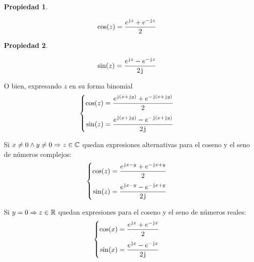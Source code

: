\documentclass[a5paper,12pt,twoside]{book}
\newtheorem{prop}{{Propiedad}}[chapter]
\begin{document}
\begin{mdframed}[style=PropertyFrame]
    \begin{prop}
    \end{prop}
    \begin{equation*}
        \cos(z) = \frac{e^{\mkern2mu\mathrm{j}\mkern1mu z} + e^{-\mkern2mu\mathrm{j}\mkern1mu z}}{2}
    \end{equation*}
\end{mdframed}

\begin{mdframed}[style=PropertyFrame]
    \begin{prop}
    \end{prop}
    \begin{equation*}
        \sin(z) = \frac{e^{\mkern2mu\mathrm{j}\mkern1mu z} - e^{-\mkern2mu\mathrm{j}\mkern1mu z}}{2 \mkern2mu\mathrm{j}\mkern1mu}
    \end{equation*}
\end{mdframed}

O bien, expresando $z$ en su forma binomial
\begin{equation*}
    \left\{
    \begin{aligned}
        \cos(z) = \frac{e^{\mkern2mu\mathrm{j}\mkern1mu \left(x + \mkern2mu\mathrm{j}\mkern1mu y \right)} + e^{-\mkern2mu\mathrm{j}\mkern1mu \left(x + \mkern2mu\mathrm{j}\mkern1mu y \right)}}{2}
        \\[1ex]
        \sin(z) = \frac{e^{\mkern2mu\mathrm{j}\mkern1mu \left(x + \mkern2mu\mathrm{j}\mkern1mu y \right)} - e^{-\mkern2mu\mathrm{j}\mkern1mu \left(x+\mkern2mu\mathrm{j}\mkern1mu y\right)}}{2 \mkern2mu\mathrm{j}\mkern1mu}
    \end{aligned}
    \right.
\end{equation*}

Si $x \neq 0 \land y \neq 0 \Rightarrow z \in \mathbb{C}$ quedan expresiones alternativas para el coseno y el seno de números complejos:
\begin{equation*}
    \left\{
    \begin{aligned}
        \cos(z) &= \frac{e^{\mkern2mu\mathrm{j}\mkern1mu x - y} + e^{-\mkern2mu\mathrm{j}\mkern1mu x + y}}{2}
        \\[1ex]
        \sin(z) &= \frac{e^{\mkern2mu\mathrm{j}\mkern1mu x - y} - e^{-\mkern2mu\mathrm{j}\mkern1mu x + y}}{2\mkern2mu\mathrm{j}\mkern1mu}
    \end{aligned}
    \right.
\end{equation*}

Si $y=0 \Rightarrow z \in \mathbb{R}$ quedan expresiones para el coseno y el seno de números reales:
\begin{equation*}
    \left\{
    \begin{aligned}
        \cos(x) &= \frac{e^{\mkern2mu\mathrm{j}\mkern1mu x} + e^{-\mkern2mu\mathrm{j}\mkern1mu x}}{2}
        \\[1ex]
        \sin(x) &= \frac{e^{\mkern2mu\mathrm{j}\mkern1mu x} - e^{-\mkern2mu\mathrm{j}\mkern1mu x}}{2\mkern2mu\mathrm{j}\mkern1mu}
    \end{aligned}
    \right.
\end{equation*}
\end{document}
